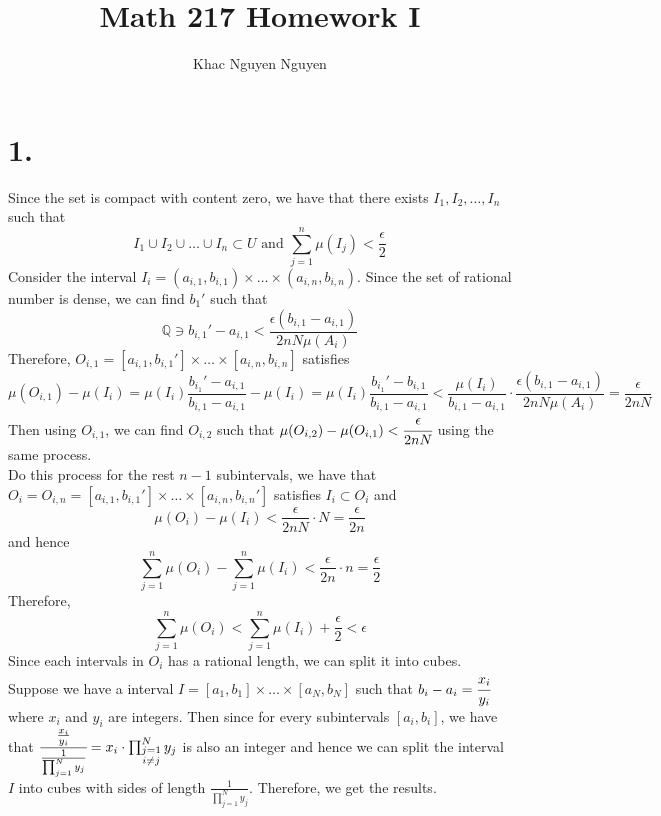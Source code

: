 \documentclass[11pt]{article}
\title{\textbf{Math 217 Homework I}}
\author{Khac Nguyen Nguyen}
\date{}
\begin{document}
\section*{1.}
Since the set is compact with content zero, we have that there exists $I_1, I_2, \ldots, I_n$ such that
\[
    I_1 \cup I_2 \cup \ldots \cup I_n \subset U \text{ and } \sum_{j=1}^n \mu(I_j) < \frac{\epsilon}{2} 
\]
Consider the interval $I_i = (a_{i,1}, b_{i,1}) \times \ldots \times (a_{i,n}, b_{i,n})$. 
Since the set of rational number is dense, we can find $b_1'$ such that 
\[
    \mathbb{Q} \ni b_{i,1}' - a_{i,1} < \frac{\epsilon (b_{i,1}- a_{i,1})}{2nN\mu(A_i)}
\]
Therefore, $O_{i,1} = [a_{i,1}, b_{i,1}'] \times \ldots \times [a_{i,n}, b_{i,n}]$ satisfies
\[
    \mu(O_{i,1}) - \mu(I_i) 
    = \mu(I_i) \frac{b_{i_1}' - a_{i,1}}{b_{i,1} - a_{i,1}} -\mu(I_i) 
    = \mu(I_i)\frac{b_{i_1}' - b_{i,1}}{b_{i,1} - a_{i,1}} 
    < \frac{\mu(I_i)}{b_{i,1} - a_{i,1}} \cdot \frac{\epsilon (b_{i,1}- a_{i,1})}{2nN\mu(A_i)} 
    = \frac{\epsilon}{2nN}
\]
Then using $O_{i,1}$, we can find $O_{i,2}$ such that $\mu(O_{i,2}) - \mu(O_{i,1}) < \cfrac{\epsilon}{2nN}$ using the same process. \\
Do this process for the rest $n-1$ subintervals, 
we have that $O_i = O_{i,n} = [a_{i,1}, b_{i,1}'] \times \ldots \times [a_{i,n}, b_{i,n}']$ satisfies $I_i \subset O_i$ and 
\[
    \mu(O_i) - \mu(I_i) < \frac{\epsilon}{2nN} \cdot N = \frac{\epsilon}{2n}
\]
and hence
\[
    \sum_{j=1}^n \mu(O_i) - \sum_{j=1}^n \mu(I_i) < \frac{\epsilon}{2n} \cdot n = \frac{\epsilon}{2}    
\]
Therefore, 
\[
    \sum_{j=1}^n \mu(O_i) < \sum_{j=1}^n \mu(I_i) + \frac{\epsilon}{2} < \epsilon    
\]
Since each intervals in $O_i$ has a rational length, we can split it into cubes. \\
Suppose we have a interval $I = [a_1,b_1] \times \ldots \times [a_N,b_N]$ such that $b_i - a_i = \cfrac{x_i}{y_i}$ where $x_i$ and $y_i$ are integers. Then
since for every subintervals $[a_i,b_i]$, we have that $\cfrac{\frac{x_i}{y_i}}{\frac{1}{\prod_{j=1}^N y_j}} = x_i \cdot \prod_{\substack{j=1 \\ i\ne j}}^N y_j$ is also an integer and hence
we can split the interval $I$ into cubes with sides of length $\frac{1}{\prod_{j=1}^N y_j}$. Therefore, 
we get the results. 
\pagebreak
\end{document}

